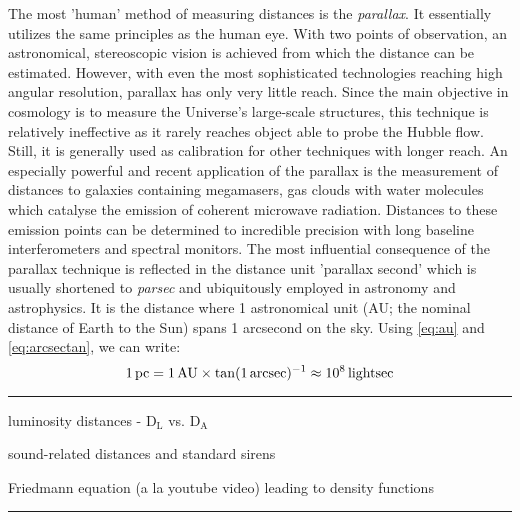 The most 'human' method of measuring distances is the \textit{parallax}.  It
essentially utilizes the same principles as the human eye.  With two points of
observation, an astronomical, stereoscopic vision is achieved from which the
distance can be estimated.  However, with even the most sophisticated
technologies reaching high angular resolution, parallax has only very little
reach.  Since the main objective in cosmology is to measure the Universe's
large-scale structures, this technique is relatively ineffective as it rarely
reaches object able to probe the Hubble flow.  Still, it is generally used as
calibration for other techniques with longer reach.  An especially powerful and
recent application of the parallax is the measurement of distances to galaxies
containing megamasers, gas clouds with water molecules which catalyse the
emission of coherent microwave radiation.  Distances to these emission points
can be determined to incredible precision with long baseline interferometers and
spectral monitors.  The most influential consequence of the parallax technique
is reflected in the distance unit 'parallax second' which is usually shortened
to \textit{parsec} and ubiquitously employed in astronomy and astrophysics.  It
is the distance where 1 astronomical unit (AU; the nominal distance of Earth to
the Sun) spans 1 arcsecond on the sky.  Using \ref{eq:au} and
\ref{eq:arcsectan}, we can write:
\begin{equation}
    1\,\parsec = 1\,\AU \times \tan(1\,\arcsec)^{-1} \approx 10^{8}\,\lightsec
    \eqlbl{parsec}
\end{equation}
 

\par\noindent\rule{\textwidth}{0.8pt}

luminosity distances - $\text{D}_{\text{L}}$ vs. $\text{D}_{\text{A}}$

sound-related distances and standard sirens

Friedmann equation (a la youtube video) leading to density functions


\par\noindent\rule{\textwidth}{0.8pt}
